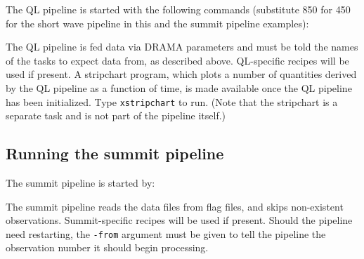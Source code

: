 The QL pipeline is started with the following commands (substitute 850
for 450 for the short wave pipeline in this and the summit pipeline
examples):
\begin{terminalv}
\end{terminalv}
The QL pipeline is fed data via DRAMA parameters and must be told the
names of the tasks to expect data from, as described
above. QL-specific recipes will be used if present. A stripchart
program, which plots a number of quantities derived by the QL pipeline
as a function of time, is made available once the QL pipeline has been
initialized. Type \verb+xstripchart+ to run. (Note that the stripchart
is a separate task and is not part of the pipeline itself.)

\subsection{Running the summit pipeline}

The summit pipeline is started by:
\begin{terminalv}
\end{terminalv}
The summit pipeline reads the data files from flag files, and skips
non-existent observations. Summit-specific recipes will be used if
present. Should the pipeline need restarting, the \verb+-from+
argument must be given to tell the pipeline the observation number it
should begin processing.

